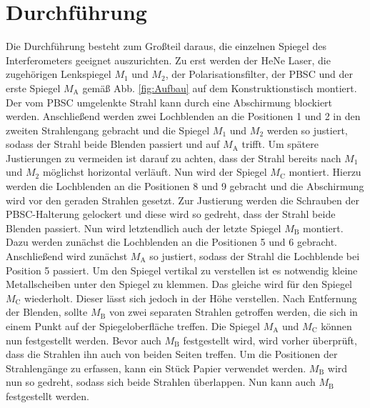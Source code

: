 
\section{Durchführung}
\label{sec:Durchführung}
Die Durchführung besteht zum Großteil daraus, die einzelnen Spiegel des Interferometers geeignet auszurichten. %
Zu erst werden der HeNe Laser, die zugehörigen Lenkspiegel $M_\text{1}$ und $M_\text{2}$, der Polarisationsfilter, der PBSC und der erste Spiegel $M_\text{A}$ gemäß Abb. \ref{fig:Aufbau} auf dem Konstruktionstisch montiert. Der vom PBSC umgelenkte Strahl kann durch eine Abschirmung blockiert werden. Anschließend werden zwei Lochblenden an die Positionen 1 und 2 in den zweiten Strahlengang gebracht und die Spiegel $M_\text{1}$ und $M_\text{2}$ werden so justiert, sodass der Strahl beide Blenden passiert und auf $M_\text{A}$ trifft. Um spätere Justierungen zu vermeiden ist darauf zu achten, dass der Strahl bereits nach $M_\text{1}$ und $M_\text{2}$ möglichst horizontal verläuft.  Nun wird der Spiegel $M_\text{C}$ montiert. Hierzu werden die Lochblenden an die Positionen 8 und 9 gebracht und die Abschirmung wird vor den geraden Strahlen gesetzt. 
Zur Justierung werden die Schrauben der PBSC-Halterung gelockert und diese wird so gedreht, dass der Strahl beide Blenden passiert. Nun wird letztendlich auch der letzte Spiegel $M_\text{B}$ montiert. Dazu werden zunächst die Lochblenden an die Positionen 5 und 6 gebracht. Anschließend wird zunächst $M_\text{A}$ so justiert, sodass der Strahl die Lochblende bei Position 5 passiert. Um den Spiegel vertikal zu verstellen ist es notwendig kleine Metallscheiben unter den Spiegel zu klemmen. Das gleiche wird für den Spiegel $M_\text{C}$ wiederholt. Dieser lässt sich jedoch in der Höhe verstellen. Nach Entfernung der Blenden, sollte $M_\text{B}$ von zwei separaten Strahlen getroffen werden, die sich in einem Punkt auf der Spiegeloberfläche treffen.
Die Spiegel $M_\text{A}$ und $M_\text{C}$ können nun festgestellt werden. Bevor auch $M_\text{B}$ festgestellt wird, wird vorher überprüft, dass die Strahlen ihn auch von beiden Seiten treffen. Um die Positionen der Strahlengänge zu erfassen, kann ein Stück Papier verwendet werden. $M_\text{B}$ wird nun so gedreht, sodass sich beide Strahlen überlappen. Nun kann auch $M_\text{B}$ festgestellt werden.
